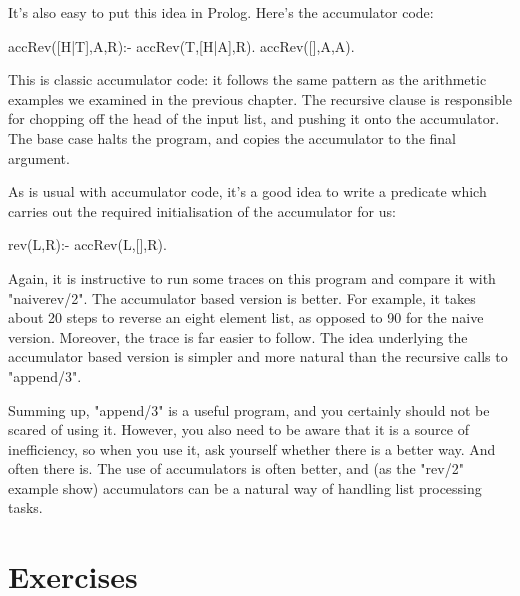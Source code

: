 It's also easy to put this idea in Prolog.  Here's the accumulator
code:
\begin{LPNcodedisplay}
accRev([H|T],A,R):- accRev(T,[H|A],R).
accRev([],A,A).
\end{LPNcodedisplay}
This is classic accumulator code: it follows the same pattern
as the arithmetic examples we examined in the previous chapter.  The
recursive clause is responsible for chopping off the head of the input
list, and pushing it onto the accumulator.  The base case halts the
program, and copies the accumulator to the final argument.

As is usual with accumulator code, it's a good idea to write a
predicate which carries out the required initialisation of the
accumulator for us:
\begin{LPNcodedisplay}
rev(L,R):- accRev(L,[],R).
\end{LPNcodedisplay}

Again, it is instructive to run some traces on this program and
compare it with "naiverev/2".  The accumulator based version is
 better. For example, it takes about 20 steps to reverse
an eight element list, as opposed to 90 for the naive version.
Moreover, the trace is far easier to follow. The idea underlying the
accumulator based version is simpler and more natural than the
recursive calls to "append/3".


Summing up, "append/3" is a useful program, and you certainly should not
be scared of using it. However, you also need to be aware that it is a
source of inefficiency, so when you use it, ask yourself whether there
is a better way.  And often there is. The use of accumulators is often
better, and (as the "rev/2" example show) accumulators can be a
natural way of handling list processing tasks.

\section{Exercises}\label{SEC.L6.EXERCISES}


